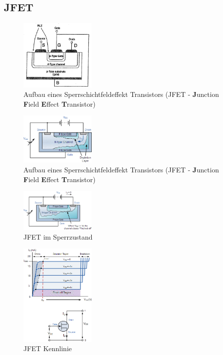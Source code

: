 \subsection{JFET }\label{k6:jfet}

    \begin{figure}[H]
        \centering
        \includegraphics[width=0.33\textwidth]{fig/jfet-aufbau.jpg}
        \caption{Aufbau eines Sperrschichtfeldeffekt Transistors (JFET - \textbf{J}unction \textbf{F}ield \textbf{E}ffect \textbf{T}ransistor)}
        \label{fig:jfet-aufbau}
    \end{figure}

    \begin{figure}[H]
        \centering
        \includegraphics[width=0.33\textwidth]{fig/jfet-open}
        \caption{Aufbau eines Sperrschichtfeldeffekt Transistors (JFET - \textbf{J}unction \textbf{F}ield \textbf{E}ffect \textbf{T}ransistor)}
        \label{fig:jfet-aufbau}
    \end{figure}

    \begin{figure}[H]
        \centering
        \includegraphics[width=0.33\textwidth]{fig/jfet-pinch-off}
        \caption{JFET im Sperrzustand}
        \label{fig:jfet-sperre}
    \end{figure}
    
    \begin{figure}[H]
        \centering
        \includegraphics[width=0.33\textwidth]{fig/jfet-operating-areas}
        \caption{JFET Kennlinie}
        \label{fig:jfet-kennlinie}
    \end{figure}
    
